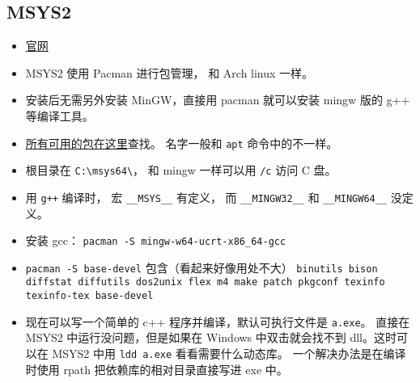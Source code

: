 \subsection{MSYS2}
\begin{itemize}
\item \href{https://www.msys2.org/}{官网}
\item MSYS2 使用 Pacman 进行包管理， 和 Arch linux 一样。
\item 安装后无需另外安装 MinGW，直接用 pacman 就可以安装 mingw 版的 g++ 等编译工具。
\item \href{https://packages.msys2.org/queue}{所有可用的包在这里}查找。 名字一般和 \verb|apt| 命令中的不一样。
\item 根目录在 \verb|C:\msys64\|， 和 mingw 一样可以用 \verb|/c| 访问 C 盘。
\item 用 \verb|g++| 编译时， 宏 \verb|__MSYS__| 有定义， 而 \verb|__MINGW32__| 和 \verb|__MINGW64__| 没定义。
\item 安装 gcc： \verb`pacman -S mingw-w64-ucrt-x86_64-gcc`
\item \verb|pacman -S base-devel| 包含（看起来好像用处不大） \verb`binutils bison diffstat diffutils dos2unix flex m4 make patch pkgconf texinfo texinfo-tex base-devel`
\item 现在可以写一个简单的 c++ 程序并编译，默认可执行文件是 \verb`a.exe`。 直接在 MSYS2 中运行没问题，但是如果在 Windows 中双击就会找不到 dll。这时可以在 MSYS2 中用 \verb`ldd a.exe` 看看需要什么动态库。 一个解决办法是在编译时使用 rpath 把依赖库的相对目录直接写进 exe 中。
\end{itemize}
